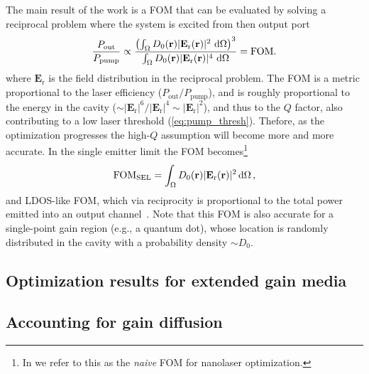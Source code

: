 The main result of the work is a FOM that can be evaluated by solving a reciprocal problem where the system is excited from then output port~\cite{ownpub4}
\begin{equation}\label{eq:eff_nl}
    \frac{P_\text{out}}{P_\text{pump}} \propto \frac{\left( \int_{\Omega} D_0(\mathbf{r})|\mathbf{E}_{\text{r}}(\mathbf{r})|^2 \,  \mathop{}\!\text{d} \Omega \right)^3} {\int_{\Omega} D_0(\mathbf{r}) |\mathbf{E}_{\text{r}}(\mathbf{r})|^4 \,  \mathop{}\!\text{d} \Omega} = \text{FOM}.
\end{equation}
where $\mathbf{E}_{\text{r}}$ is the field distribution in the reciprocal problem. The FOM is a metric proportional to the laser efficiency ($P_\text{out}/P_\text{pump}$), and is roughly proportional 
to the energy in the cavity ($\sim |\mathbf{E}_{\text{r}}|^6 / |\mathbf{E}_{\text{r}}|^4 \sim |\mathbf{E}_{\text{r}}|^2$), and thus to the $Q$ factor, also contributing to a low
laser threshold (\eqref{eq:pump_thresh}). Thefore, as the optimization progresses the high-$Q$ assumption will become more and more accurate. In the single emitter limit the FOM becomes\footnote{In \cite{ownpub4} we refer to this as the \emph{naive} FOM for nanolaser optimization.}
\begin{equation}\label{eq:SEL}
    \text{FOM}_\text{SEL}=\int_{\Omega} D_0(\mathbf{r}) |\mathbf{E}_{\text{r}}(\mathbf{r})|^2 \mathop{}\!\text{d} \Omega\,,
\end{equation}
and LDOS-like FOM, which via reciprocity is proportional to the total power emitted into an output channel~\cite[App.~C]{reci}. Note that this FOM is also accurate for a single-point gain region (e.g., a quantum dot),
whose location is randomly distributed in the cavity with a probability density $\sim D_0$. 

\subsection*{Optimization results for extended gain media}

\subsection*{Accounting for gain diffusion}

